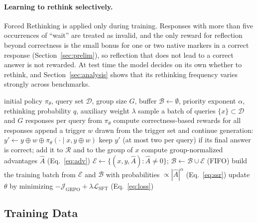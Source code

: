 \documentclass{article}
\newcommand{\model}{\texttt{\textsc{VL-Rethinker}}\xspace}
\begin{document}
\paragraph{Learning to rethink selectively.} Forced Rethinking is applied only during training. Responses with more than five occurrences of ``wait'' are treated as invalid, and the only reward for reflection beyond correctness is the small bonus for one or two native markers in a correct response (Section~\ref{sec:prelim}), so reflection that does not lead to a correct answer is not rewarded. At test time the model decides on its own whether to rethink, and Section~\ref{sec:analysis} shows that its rethinking frequency varies strongly across benchmarks.



\begin{algorithm}[t]
\caption{\model training (GRPO-SSR with Forced Rethinking)}
\label{alg:main}
\begin{algorithmic}[1]
\Require initial policy $\pi_\theta$, query set $\mathcal{D}$, group size $G$, buffer $\mathcal{B}\gets\emptyset$, priority exponent $\alpha$, rethinking probability $q$, auxiliary weight $\lambda$
  \State sample a batch of queries $\{x\}\subset\mathcal{D}$ and $G$ responses per query from $\pi_\theta$
  \State compute correctness-based rewards for all responses
    \State append a trigger $w$ drawn from the trigger set and continue generation: $y'\gets y\oplus w\oplus\pi_\theta(\cdot\mid x,y\oplus w)$
    \State keep $y'$ (at most two per query) if its final answer is correct; add it to $\mathcal{R}$ and to the group of $x$
  \EndFor
  \State compute group-normalized advantages $\hat{A}$ (Eq.~\ref{eq:adv})
  \State $\mathcal{E}\gets\{(x,y,\hat{A}):\hat{A}\neq0\}$; \quad $\mathcal{B}\gets\mathcal{B}\cup\mathcal{E}$ (FIFO)
  \State build the training batch from $\mathcal{E}$ and $\mathcal{B}$ with probabilities $\propto|\hat{A}|^{\alpha}$ (Eq.~\ref{eq:ssr})
  \State update $\theta$ by minimizing $-\mathcal{J}_\text{GRPO}+\lambda\mathcal{L}_\text{SFT}$ (Eq.~\ref{eq:loss})
\EndFor
\end{algorithmic}
\end{algorithm}

\subsection{Training Data}
\label{sec:data}
\end{document}
